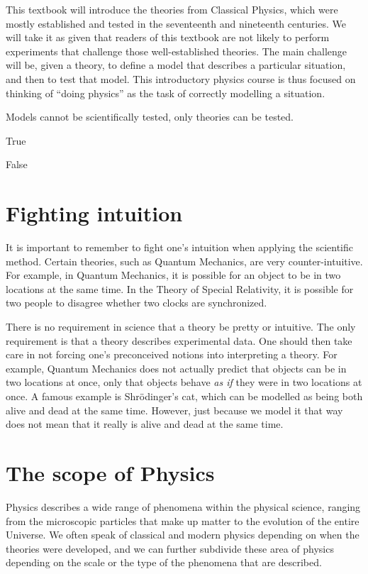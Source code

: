 This textbook will introduce the theories from Classical Physics, which were mostly established and tested in the seventeenth and nineteenth centuries. We will take it as given that readers of this textbook are not likely to perform experiments that challenge those well-established theories. The main challenge will be, given a theory, to define a model that describes a particular situation, and then to test that model. This introductory physics course is thus focused on thinking of ``doing physics'' as the task of correctly modelling a situation.

\begin{checkpointMC}{Models cannot be scientifically tested, only theories can be tested.}
\item True
\item False
\end{checkpointMC}

\section{Fighting intuition}
It is important to remember to fight one's intuition when applying the scientific method. Certain theories, such as Quantum Mechanics, are very counter-intuitive. For example, in Quantum Mechanics, it is possible for an object to be in two locations at the same time. In the Theory of Special Relativity, it is possible for two people to disagree whether two clocks are synchronized.

There is no requirement in science that a theory be pretty or intuitive. The only requirement is that a theory describes experimental data. One should then take care in not forcing one's preconceived notions into interpreting a theory. For example, Quantum Mechanics does not actually predict that objects can be in two locations at once, only that objects behave \textit{as if} they were in two locations at once. A famous example is Shr\"odinger's cat, which can be modelled as being both alive and dead at the same time. However, just because we model it that way does not mean that it really is alive and dead at the same time. 

\section{The scope of Physics}
Physics describes a wide range of phenomena within the physical science, ranging from the microscopic particles that make up matter to the evolution of the entire Universe. We often speak of classical and modern physics depending on when the theories were developed, and we can further subdivide these area of physics depending on the scale or the type of the phenomena that are described.

